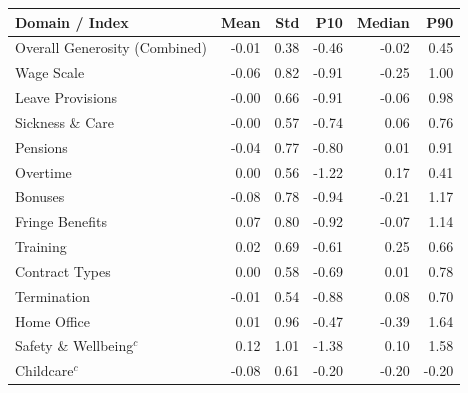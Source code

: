 \begin{tabular}{lrrrrr}
    \hline\hline
    Domain / Index & Mean & Std & P10 & Median & P90 \\
    \hline
    Overall Generosity (Combined) & -0.01 & 0.38 & -0.46 & -0.02 & 0.45 \\
    Wage Scale & -0.06 & 0.82 & -0.91 & -0.25 & 1.00 \\
    Leave Provisions & -0.00 & 0.66 & -0.91 & -0.06 & 0.98 \\
    Sickness \& Care & -0.00 & 0.57 & -0.74 & 0.06 & 0.76 \\
    Pensions & -0.04 & 0.77 & -0.80 & 0.01 & 0.91 \\
    Overtime & 0.00 & 0.56 & -1.22 & 0.17 & 0.41 \\
    Bonuses & -0.08 & 0.78 & -0.94 & -0.21 & 1.17 \\
    Fringe Benefits & 0.07 & 0.80 & -0.92 & -0.07 & 1.14 \\
    Training & 0.02 & 0.69 & -0.61 & 0.25 & 0.66 \\
    Contract Types & 0.00 & 0.58 & -0.69 & 0.01 & 0.78 \\
    Termination & -0.01 & 0.54 & -0.88 & 0.08 & 0.70 \\
    Home Office & 0.01 & 0.96 & -0.47 & -0.39 & 1.64 \\
    Safety \& Wellbeing$^{c}$ & 0.12 & 1.01 & -1.38 & 0.10 & 1.58 \\
    Childcare$^{c}$ & -0.08 & 0.61 & -0.20 & -0.20 & -0.20 \\
    \hline\hline
\end{tabular}
